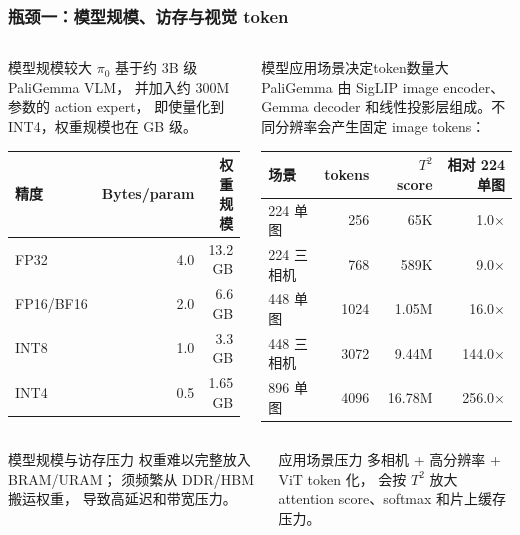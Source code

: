 \documentclass[10pt, aspectratio=169]{beamer}
\begin{document}
\begin{frame}
  \frametitle{瓶颈一：模型规模、访存与视觉 token}
  \small
  \begin{columns}[T,onlytextwidth]
    \begin{block}{模型规模较大}
      $\pi_0$ 基于约 3B 级 PaliGemma VLM，
      并加入约 300M 参数的 action expert，
      即使量化到 INT4，权重规模也在 GB 级。\\
      \vspace{4pt}
      \setlength{\tabcolsep}{5pt}
      \begin{tabular}{@{}lrr@{}}
        \toprule
        精度        & Bytes/param & 权重规模    \\
        \midrule
        FP32      & 4.0         & 13.2 GB \\
        FP16/BF16 & 2.0         & 6.6 GB  \\
        INT8      & 1.0         & 3.3 GB  \\
        INT4      & 0.5         & 1.65 GB \\
        \bottomrule
      \end{tabular}
    \end{block}
    \begin{block}{模型应用场景决定token数量大}
      PaliGemma 由 SigLIP image encoder、Gemma decoder
      和线性投影层组成。不同分辨率会产生固定 image tokens：\\
      \vspace{4pt}
      \begin{tabular}{@{}lrrr@{}}
        \toprule
        场景      & tokens & $T^2$ score & 相对 224 单图     \\
        \midrule
        224 单图  & 256    & 65K         & 1.0$\times$   \\
        224 三相机 & 768    & 589K        & 9.0$\times$   \\
        448 单图  & 1024   & 1.05M       & 16.0$\times$  \\
        448 三相机 & 3072   & 9.44M       & 144.0$\times$ \\
        896 单图  & 4096   & 16.78M      & 256.0$\times$ \\
        \bottomrule
      \end{tabular}
    \end{block}
    \vspace{6pt}
  \end{columns}
  \begin{columns}[T,onlytextwidth]
    \begin{alertblock}{模型规模与访存压力}
      权重难以完整放入 BRAM/URAM；
      须频繁从 DDR/HBM 搬运权重，
      导致高延迟和带宽压力。
    \end{alertblock}
    \begin{exampleblock}{应用场景压力}
      多相机 + 高分辨率 + ViT token 化，
      会按 $T^2$ 放大 attention score、softmax 和片上缓存压力。
    \end{exampleblock}
  \end{columns}
\end{frame}
\end{document}

